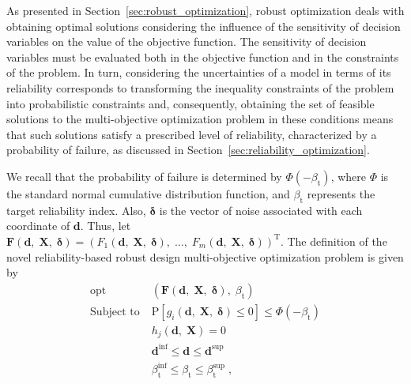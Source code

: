 \documentclass[final,5p,times,twocolumn,numbers]{elsarticle}
\newcommand{\vect}[1]{\mathbf{\boldsymbol{#1}}}
\DeclareMathOperator*{\opt}{opt}
\begin{document}
As presented in Section~\ref{sec:robust_optimization}, robust optimization deals with obtaining optimal solutions considering the influence of the sensitivity of decision variables on the value of the objective function. The sensitivity of decision variables must be evaluated both in the objective function and in the constraints of the problem. In turn, considering the uncertainties of a model in terms of its reliability corresponds to transforming the inequality constraints of the problem into probabilistic constraints and, consequently, obtaining the set of feasible solutions to the multi-objective optimization problem in these conditions means that such solutions satisfy a prescribed level of reliability, characterized by a probability of failure, as discussed in Section~\ref{sec:reliability_optimization}.

We recall that the probability of failure is determined by $ \Phi \left( -\beta_{\mathrm{t}} \right) $, where $ \Phi $ is the standard normal cumulative distribution function, and $ \beta_{\mathrm{t}} $ represents the target reliability index. Also, $ \vect{\delta} $ is the vector of noise associated with each coordinate of $ \mathbf{d} $. Thus, let $ \mathbf{F} \left( \mathbf{d}, \; \mathbf{X}, \; \vect{\delta} \right) = \left( F_{1} \left( \mathbf{d}, \; \mathbf{X}, \; \vect{\delta} \right), \; \dots, \; F_{m} \left( \mathbf{d}, \; \mathbf{X}, \; \vect{\delta} \right) \right)^{\mathrm{T}} $. The definition of the novel reliability-based robust design multi-objective optimization problem is given by
%
\begin{equation} \label{eq:formulacao_multiobjetivo_incertezas}
\begin{split}
\opt \; &\left( \mathbf{F} \left( \mathbf{d}, \; \mathbf{X}, \; \vect{\delta} \right), \; \beta_{\mathrm{t}} \right)\\
\textrm{Subject to} \; &\mathrm{P} \left[ g_{i} \left( \mathbf{d}, \; \mathbf{X}, \; \vect{\delta} \right) \leq 0 \right] \leq \Phi \left( -\beta_{\mathrm{t}} \right)\\
\phantom{Subject to} \; &h_{j} \left( \mathbf{d}, \; \mathbf{X} \right) = 0\\
\phantom{Subject to} \; &\mathbf{d}^{\mathrm{inf}} \leq \mathbf{d} \leq \mathbf{d}^{\mathrm{sup}}\\
\phantom{Subject to} \; &\beta_{\mathrm{t}}^{\mathrm{inf}} \leq \beta_{\mathrm{t}} \leq \beta_{\mathrm{t}}^{\mathrm{sup}} \; ,
\end{split}
\end{equation}
\end{document}
